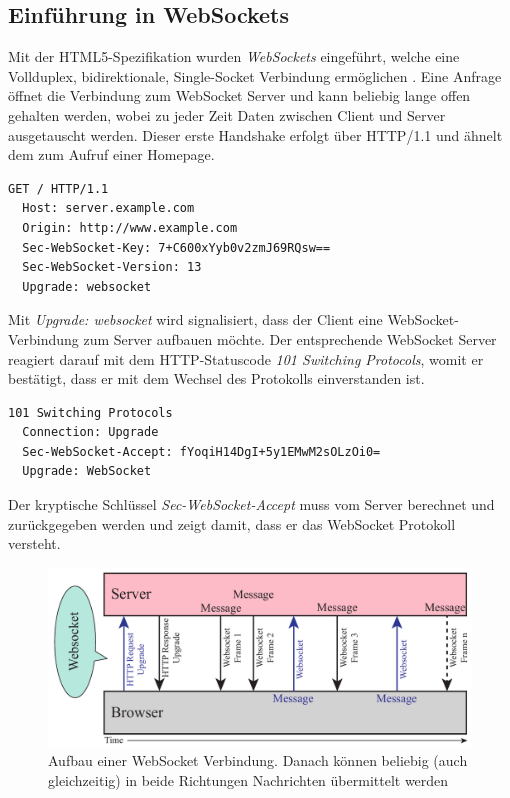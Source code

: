 \subsection{Einführung in WebSockets}
Mit der HTML5-Spezifikation wurden \emph{WebSockets} eingeführt, welche eine Vollduplex, bidirektionale, Single-Socket Verbindung ermöglichen \cite[S. Introducing WebSocket]{ws}. Eine Anfrage öffnet die Verbindung zum WebSocket Server und kann beliebig lange offen gehalten werden, wobei zu jeder Zeit Daten zwischen Client und Server ausgetauscht werden. Dieser erste Handshake erfolgt über HTTP/1.1 und ähnelt dem zum Aufruf einer Homepage.
\\
\begin{lstlisting}[captionpos=b, caption=HTTP Request vom Client {\cite[S. 6]{rfc6455:handshake}}]
  GET / HTTP/1.1
  Host: server.example.com
  Origin: http://www.example.com
  Sec-WebSocket-Key: 7+C600xYyb0v2zmJ69RQsw==
  Sec-WebSocket-Version: 13
  Upgrade: websocket
\end{lstlisting}

Mit \emph{Upgrade: websocket} wird signalisiert, dass der Client eine WebSocket-Verbindung zum Server aufbauen möchte. Der entsprechende WebSocket Server reagiert darauf mit dem HTTP-Statuscode \emph{101 Switching Protocols}, womit er bestätigt, dass er mit dem Wechsel des Protokolls einverstanden ist.
\\
\begin{lstlisting}[captionpos=b, caption=HTTP Response vom Server {\cite[S. 8]{rfc6455:handshake}}]
  101 Switching Protocols
  Connection: Upgrade
  Sec-WebSocket-Accept: fYoqiH14DgI+5y1EMwM2sOLzOi0=
  Upgrade: WebSocket
\end{lstlisting}

Der kryptische Schlüssel \emph{Sec-WebSocket-Accept} muss vom Server berechnet und zurückgegeben werden und zeigt damit, dass er das WebSocket Protokoll versteht.

\begin{figure}[!ht]
	\centering
	\includegraphics[width=15cm]{fig/websockets}
	\caption{Aufbau einer WebSocket Verbindung. Danach können beliebig (auch gleichzeitig) in beide Richtungen Nachrichten übermittelt werden}
\end{figure}
























